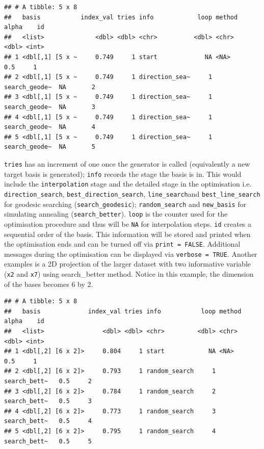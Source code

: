 \documentclass[12pt]{article}
\newenvironment{Shaded}{\begin{snugshade}}{\end{snugshade}}
\newcommand{\DecValTok}[1]{\textcolor[rgb]{0.00,0.00,0.81}{#1}}
\newcommand{\KeywordTok}[1]{\textcolor[rgb]{0.13,0.29,0.53}{\textbf{#1}}}
\newcommand{\NormalTok}[1]{#1}
\newcommand{\OperatorTok}[1]{\textcolor[rgb]{0.81,0.36,0.00}{\textbf{#1}}}
\newcommand{\StringTok}[1]{\textcolor[rgb]{0.31,0.60,0.02}{#1}}
\begin{document}
\begin{verbatim}
## # A tibble: 5 x 8
##   basis           index_val tries info            loop method        alpha    id
##   <list>              <dbl> <dbl> <chr>          <dbl> <chr>         <dbl> <int>
## 1 <dbl[,1] [5 x ~     0.749     1 start             NA <NA>            0.5     1
## 2 <dbl[,1] [5 x ~     0.749     1 direction_sea~     1 search_geode~  NA       2
## 3 <dbl[,1] [5 x ~     0.749     1 direction_sea~     1 search_geode~  NA       3
## 4 <dbl[,1] [5 x ~     0.749     1 direction_sea~     1 search_geode~  NA       4
## 5 <dbl[,1] [5 x ~     0.749     1 direction_sea~     1 search_geode~  NA       5
\end{verbatim}

\texttt{tries} has an increment of one once the generator is called
(equivalently a new target basis is generated); \texttt{info} records
the stage the basis is in. This would include the \texttt{interpolation}
stage and the detailed stage in the optimisation i.e.
\texttt{direction\_search}, \texttt{best\_direction\_search},
\texttt{line\_search}and \texttt{best\_line\_search} for geodesic
searching (\texttt{search\_geodesic}); \texttt{random\_search} and
\texttt{new\_basis} for simulating annealing (\texttt{search\_better}).
\texttt{loop} is the counter used for the optimisation procedure and
thus will be \texttt{NA} for interpolation steps. \texttt{id} creates a
sequential order of the basis. This information will be stored and
printed when the optimisation ends and can be turned off via
\texttt{print\ =\ FALSE}. Additional messages during the optimisation
can be displayed via \texttt{verbose\ =\ TRUE}. Another examples is a 2D
projection of the larger dataset with two informative variable
(\texttt{x2} and \texttt{x7}) using search\_better method. Notice in
this example, the dimension of the bases becomes 6 by 2.

\begin{Shaded}
\end{Shaded}

\begin{verbatim}
## # A tibble: 5 x 8
##   basis             index_val tries info           loop method       alpha    id
##   <list>                <dbl> <dbl> <chr>         <dbl> <chr>        <dbl> <int>
## 1 <dbl[,2] [6 x 2]>     0.804     1 start            NA <NA>           0.5     1
## 2 <dbl[,2] [6 x 2]>     0.793     1 random_search     1 search_bett~   0.5     2
## 3 <dbl[,2] [6 x 2]>     0.784     1 random_search     2 search_bett~   0.5     3
## 4 <dbl[,2] [6 x 2]>     0.773     1 random_search     3 search_bett~   0.5     4
## 5 <dbl[,2] [6 x 2]>     0.795     1 random_search     4 search_bett~   0.5     5
\end{verbatim}
\end{document}
